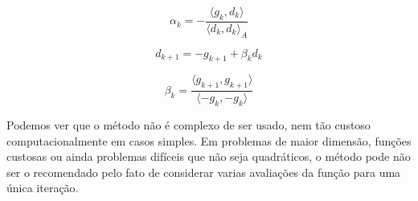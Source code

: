 \begin{equation}
\alpha_k= - \frac{\langle g_k, d_k \rangle}{\langle d_k, d_k \rangle_A}
\end{equation}

\begin{equation}
d_{k+1} = -g_{k+1} + \beta_k d_k
\end{equation}

\begin{equation}
\beta_k = \frac{\langle g_{k+1}, g_{k+1} \rangle}{\langle -g_{k}, - g_k \rangle}
\end{equation}

Podemos ver que o método não é complexo de ser usado, nem tão custoso computacionalmente em casos simples.
Em problemas de maior dimensão, funções custosas ou ainda problemas difíceis que não seja quadráticos, o
método pode não ser o recomendado pelo fato de considerar varias avaliações da função para uma única iteração.